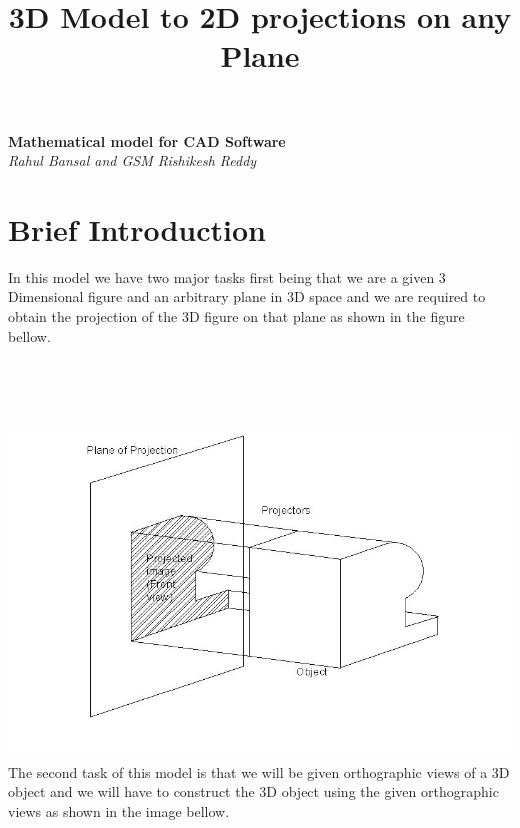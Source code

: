 \documentclass[18pt]{article}
\begin{document}
\begin{titlepage}
   \begin{center}
      \Large\textbf{Mathematical model for CAD Software}\\
      \large\textit{Rahul Bansal and GSM Rishikesh Reddy}
   \end{center}
\end{titlepage}
\title{3D Model to 2D projections on any Plane}
\maketitle
\section{Brief Introduction}
\large{In this model we have two major tasks first being that we are a given 3 Dimensional figure and an arbitrary plane in 3D space and we are required to obtain the projection of the 3D figure on that plane as shown in the figure bellow.}\\{}\\{}\\{}\\{}\\
\includegraphics[scale=0.75]{3d_to_2d.png}
\large{The second task of this model is that we will be given orthographic views of a 3D object and we will have to construct the 3D object using the given orthographic views as shown in the image bellow. }\\{}\\{}\\{}\\{}\\
\end{document}
